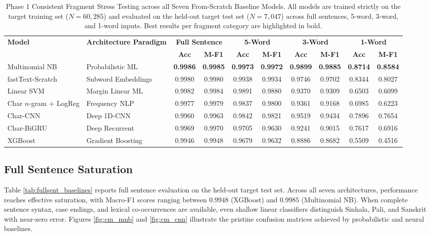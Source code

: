\documentclass[11pt]{article}
\begin{document}
\begin{table}[t]
\centering
\small
\caption{Phase 1 Consistent Fragment Stress Testing across all Seven From-Scratch Baseline Models. All models are trained strictly on the target training set ($N=60,285$) and evaluated on the held-out target test set ($N=7,047$) across full sentences, 5-word, 3-word, and 1-word inputs. Best results per fragment category are highlighted in bold.}
\label{tab:frag_stress_consistent}
\begin{tabular}{ll cccccccc}
\toprule
\multirow{2}{*}{\textbf{Model}} & \multirow{2}{*}{\textbf{Architecture Paradigm}} & \multicolumn{2}{c}{\textbf{Full Sentence}} & \multicolumn{2}{c}{\textbf{5-Word}} & \multicolumn{2}{c}{\textbf{3-Word}} & \multicolumn{2}{c}{\textbf{1-Word}} \\
\cmidrule(lr){3-4} \cmidrule(lr){5-6} \cmidrule(lr){7-8} \cmidrule(lr){9-10}
& & \textbf{Acc} & \textbf{M-F1} & \textbf{Acc} & \textbf{M-F1} & \textbf{Acc} & \textbf{M-F1} & \textbf{Acc} & \textbf{M-F1} \\
\midrule
Multinomial NB & Probabilistic ML & \textbf{0.9986} & \textbf{0.9985} & \textbf{0.9973} & \textbf{0.9972} & \textbf{0.9899} & \textbf{0.9885} & \textbf{0.8714} & \textbf{0.8584} \\
fastText-Scratch & Subword Embeddings & 0.9980 & 0.9980 & 0.9938 & 0.9934 & 0.9746 & 0.9702 & 0.8344 & 0.8027 \\
Linear SVM & Margin Linear ML & 0.9982 & 0.9984 & 0.9891 & 0.9880 & 0.9370 & 0.9309 & 0.6503 & 0.6099 \\
Char $n$-gram + LogReg & Frequency NLP & 0.9977 & 0.9979 & 0.9837 & 0.9800 & 0.9361 & 0.9168 & 0.6985 & 0.6223 \\
Char-CNN & Deep 1D-CNN & 0.9960 & 0.9963 & 0.9842 & 0.9821 & 0.9519 & 0.9434 & 0.7896 & 0.7654 \\
Char-BiGRU & Deep Recurrent & 0.9969 & 0.9970 & 0.9705 & 0.9630 & 0.9241 & 0.9015 & 0.7617 & 0.6916 \\
XGBoost & Gradient Boosting & 0.9946 & 0.9948 & 0.9679 & 0.9632 & 0.8886 & 0.8682 & 0.5509 & 0.4516 \\
\bottomrule
\end{tabular}
\end{table}

\subsection{Full Sentence Saturation}
Table \ref{tab:fullsent_baselines} reports full sentence evaluation on the held-out target test set. Across all seven architectures, performance reaches effective saturation, with Macro-F1 scores ranging between $0.9948$ (XGBoost) and $0.9985$ (Multinomial NB). When complete sentence syntax, case endings, and lexical co-occurrences are available, even shallow linear classifiers distinguish Sinhala, Pali, and Sanskrit with near-zero error. Figures \ref{fig:cm_mnb} and \ref{fig:cm_cnn} illustrate the pristine confusion matrices achieved by probabilistic and neural baselines.
\end{document}
